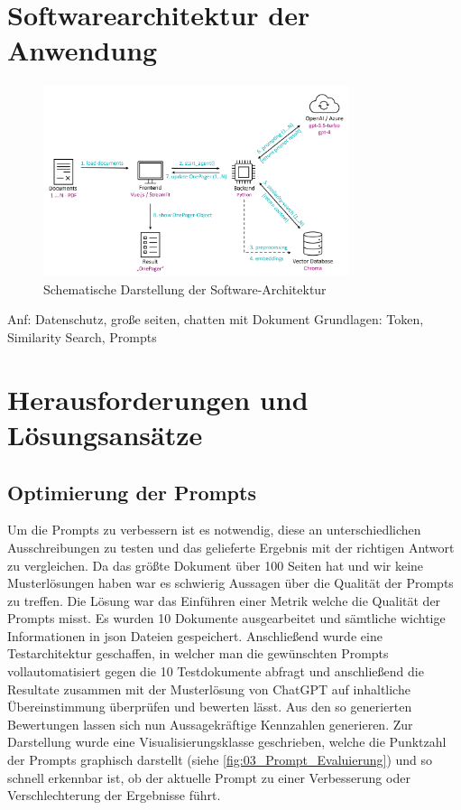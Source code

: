 \section{Softwarearchitektur der Anwendung}

\begin{figure}[h]
    \centering
    \includegraphics[width=0.8\textwidth]{figures/DokumentenAgent-Uebersicht.png}
    \caption{Schematische Darstellung der Software-Architektur}
    \label{fig:DokumentenAgent-uebersicht}    %
\end{figure}

Anf: Datenschutz, große seiten, chatten mit Dokument
Grundlagen: Token, Similarity Search, Prompts

\section{Herausforderungen und Lösungsansätze}

\subsection{Optimierung der Prompts}
Um die Prompts zu verbessern ist es notwendig, diese an unterschiedlichen Ausschreibungen zu testen und das gelieferte 
Ergebnis mit der richtigen Antwort zu vergleichen. Da das größte Dokument über 100 Seiten hat und wir keine Musterlösungen 
haben war es schwierig Aussagen über die Qualität der Prompts zu treffen. Die Lösung war das Einführen einer Metrik welche 
die Qualität der Prompts misst. Es wurden 10 Dokumente ausgearbeitet und sämtliche wichtige Informationen in json Dateien 
gespeichert. Anschließend wurde eine Testarchitektur geschaffen, in welcher man die gewünschten Prompts vollautomatisiert 
gegen die 10 Testdokumente abfragt und anschließend die Resultate zusammen mit der Musterlösung von ChatGPT auf inhaltliche 
Übereinstimmung überprüfen und bewerten lässt. Aus den so generierten Bewertungen lassen sich nun Aussagekräftige Kennzahlen 
generieren. Zur Darstellung wurde eine Visualisierungsklasse geschrieben, welche die Punktzahl der Prompts graphisch darstellt 
(siehe \ref{fig:03_Prompt_Evaluierung}) und so schnell erkennbar ist, ob der aktuelle Prompt zu einer Verbesserung 
oder Verschlechterung der Ergebnisse führt.

